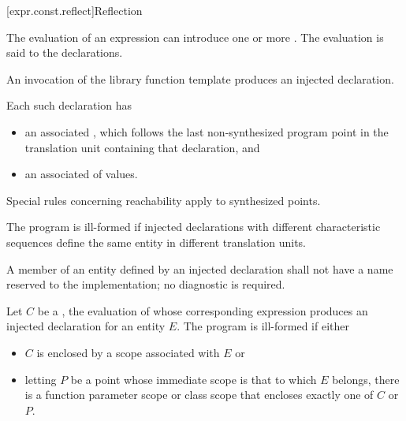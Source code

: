 [expr.const.reflect]{Reflection}

\pnum
The evaluation of an expression can introduce
one or more .
The evaluation is said to  the declarations.
\begin{note}
An invocation of
the library function template 
produces an injected declaration.
\end{note}
Each such declaration has
\begin{itemize}
\item
an associated ,
which follows the last non-synthesized program point
in the translation unit containing that declaration, and
\item
an associated  of values.
\end{itemize}
\begin{note}
Special rules concerning reachability
apply to synthesized points.
\end{note}
\begin{note}
The program is ill-formed
if injected declarations with different characteristic sequences
define the same entity in different translation units.
\end{note}

\pnum
A member of an entity defined by an injected declaration
shall not have a name reserved to the implementation;
no diagnostic is required.

\pnum
Let $C$ be a ,
the evaluation of whose corresponding expression
produces an injected declaration for an entity $E$.
The program is ill-formed if either
\begin{itemize}
\item
$C$ is enclosed by a scope associated with $E$ or
\item
letting $P$ be a point whose immediate scope is that to which $E$ belongs,
there is a function parameter scope or class scope
that encloses exactly one of $C$ or $P$.
\end{itemize}

